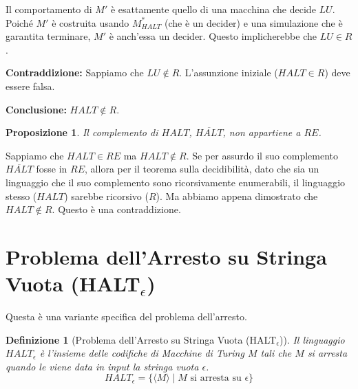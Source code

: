 \documentclass[a4paper]{article}
\makeatletter
\newtheorem{definition}{Definizione}[section] %
\newtheorem{proposition}{Proposizione}[section]
\renewenvironment{proof}[1][\proofname]{\par
  \pushQED{\qed}%
  \normalfont \topsep6\p@\@plus6\p@\relax
  \trivlist
  \item[\hskip\labelsep
        \bfseries
    #1\@addpunct{.}]\ignorespaces
}{%
  \popQED\endtrivlist\@endpefalse
}
\makeatother
\begin{document}
\begin{proof}
Il comportamento di $M'$ è esattamente quello di una macchina che decide $LU$. Poiché $M'$ è costruita usando $M_{HALT}^*$ (che è un decider) e una simulazione che è garantita terminare, $M'$ è anch'essa un decider. Questo implicherebbe che $LU \in R$.

\textbf{Contraddizione:} Sappiamo che $LU \notin R$.
L'assunzione iniziale ($HALT \in R$) deve essere falsa.

\textbf{Conclusione:} $HALT \notin R$.
\end{proof}

\begin{proposition}
Il complemento di $HALT$, $\overline{HALT}$, non appartiene a $RE$.
\end{proposition}
\begin{proof}
Sappiamo che $HALT \in RE$ ma $HALT \notin R$. Se per assurdo il suo complemento $\overline{HALT}$ fosse in $RE$, allora per il teorema sulla decidibilità, dato che sia un linguaggio che il suo complemento sono ricorsivamente enumerabili, il linguaggio stesso ($HALT$) sarebbe ricorsivo ($R$). Ma abbiamo appena dimostrato che $HALT \notin R$. Questo è una contraddizione.
\end{proof}

\section{Problema dell'Arresto su Stringa Vuota (HALT$_\epsilon$)}
Questa è una variante specifica del problema dell'arresto.
\begin{definition}[Problema dell'Arresto su Stringa Vuota (HALT$_\epsilon$)]
Il linguaggio $HALT_\epsilon$ è l'insieme delle codifiche di Macchine di Turing $M$ tali che $M$ si arresta quando le viene data in input la stringa vuota $\epsilon$.
\[ HALT_\epsilon = \{ \langle M \rangle \mid M \text{ si arresta su } \epsilon \} \]
\end{definition}
\end{document}
